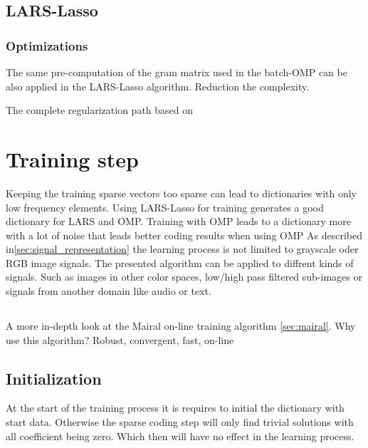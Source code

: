 \subsection{LARS-Lasso}
\subsubsection*{Optimizations}
The same pre-computation of the gram matrix used in the batch-OMP can be
also applied in the LARS-Lasso algorithm. Reduction the complexity. %

The complete regularization path based on\cite{Efron2004}


\section{Training step}
Keeping the training sparse vectors too sparse can lead to dictionaries with
only low frequency elements. Using LARS-Lasso for training generates a good
dictionary for LARS and OMP. Training with OMP leads to a dictionary more with a
lot of noise that leads better coding results when using OMP 
As described in\ref{sec:signal_representation} the learning process is not
limited to grayscale oder RGB image signals. The presented algorithm can be
applied to diffrent kinds of signals. Such as images in other color
spaces, low/high pass filtered sub-images or signals from another domain like
audio or text. 


\subsection{\trainDL}
A more in-depth look at the Mairal on-line training algorithm \ref{sec:mairal}. 
Why use this algorithm? Robust, convergent, fast, on-line

\subsection{Initialization}
At the start of the training process it is requires to initial the
dictionary with start data. Otherwise the sparse coding step will only find
trivial solutions with all coefficient being zero. Which then will have no
effect in the learning process.

